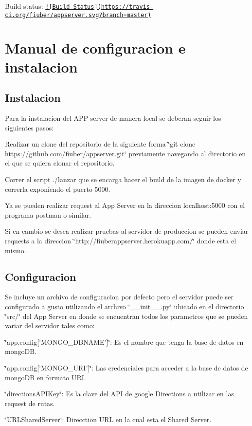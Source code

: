 Build status\-: \href{https://travis-ci.org/fiuber/appserver}{\tt !\mbox{[}Build Status\mbox{]}(https\-://travis-\/ci.\-org/fiuber/appserver.\-svg?branch=master)}

\section*{Manual de configuracion e instalacion}

\subsection*{Instalacion}

Para la instalacion del A\-P\-P server de manera local se deberan seguir los siguientes pasos\-:


\begin{DoxyItemize}
\item Realizar un clone del repositorio de la siguiente forma \char`\"{}git clone https\-://github.\-com/fiuber/appserver.\-git\char`\"{} previamente navegando al directorio en el que se quiera clonar el repositorio.
\item Correr el script ./lanzar que se encarga hacer el build de la imagen de docker y correrla exponiendo el puerto 5000.
\item Ya se pueden realizar request al App Server en la direccion localhost\-:5000 con el programa postman o similar.
\end{DoxyItemize}

Si en cambio se desea realizar pruebas al servidor de produccion se pueden enviar requests a la direccion \char`\"{}http\-://fiuberappserver.\-herokuapp.\-com/\char`\"{} donde esta el mismo.

\subsection*{Configuracion}

Se incluye un archivo de configuracion por defecto pero el servidor puede ser configurado a gusto utilizando el archivo \char`\"{}\-\_\-\-\_\-init\-\_\-\-\_\-.\-py\char`\"{} ubicado en el directorio \char`\"{}src/\char`\"{} del App Server en donde se encuentran todos los parametros que se pueden variar del servidor tales como\-:


\begin{DoxyItemize}
\item \char`\"{}app.\-config\mbox{[}'\-M\-O\-N\-G\-O\-\_\-\-D\-B\-N\-A\-M\-E'\mbox{]}\char`\"{}\-: Es el nombre que tenga la base de datos en mongo\-D\-B.
\item \char`\"{}app.\-config\mbox{[}'\-M\-O\-N\-G\-O\-\_\-\-U\-R\-I'\mbox{]}\char`\"{}\-: Las credenciales para acceder a la base de datos de mongo\-D\-B en formato U\-R\-I.
\item \char`\"{}directions\-A\-P\-I\-Key\char`\"{}\-: Es la clave del A\-P\-I de google Directions a utilizar en las request de rutas.
\item \char`\"{}\-U\-R\-L\-Shared\-Server\char`\"{}\-: Direcction U\-R\-L en la cual esta el Shared Server.
\end{DoxyItemize}

